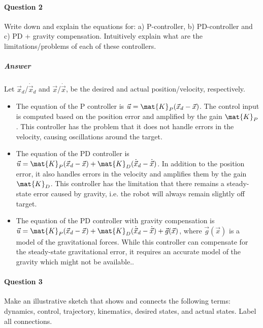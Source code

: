 	\paragraph{Question 2}
		Write down and explain the equations for: a) P-controller, b) PD-controller and c) PD + gravity compensation. Intuitively explain what are the limitations/problems of each of these controllers.

		\subparagraph{Answer}
			Let \(\vec{x}_d\)/\(\dot{\vec{x}}_d\) and \(\vec{x}\)/\(\dot{\vec{x}}\), be the desired and actual position/velocity, respectively.
			\begin{itemize}
				\item The equation of the P controller is \( \vec{u} = \mat{K}_P (\vec{x}_d - \vec{x}) \). The control input is computed based on the position error and amplified by the gain \(\mat{K}_P\). This controller has the problem that it does not handle errors in the velocity, causing oscillations around the target.
				\item The equation of the PD controller is \( \vec{u} = \mat{K}_P (\vec{x}_d - \vec{x}) + \mat{K}_D (\dot{\vec{x}}_d - \dot{\vec{x}}) \). In addition to the position error, it also handles errors in the velocity and amplifies them by the gain \(\mat{K}_D\). This controller has the limitation that there remains a steady-state error caused by gravity, i.e. the robot will always remain slightly off target.
				\item The equation of the PD controller with gravity compensation is \( \vec{u} = \mat{K}_P (\vec{x}_d - \vec{x}) + \mat{K}_D (\dot{\vec{x}}_d - \dot{\vec{x}}) + \vec{g}(\vec{x}) \), where \(\vec{g}(\vec{x})\) is a model of the gravitational forces. While this controller can compensate for the steady-state gravitational error, it requires an accurate model of the gravity which might not be available..
			\end{itemize}

	\paragraph{Question 3}
		Make an illustrative sketch that shows and connects the following terms: dynamics, control, trajectory, kinematics, desired states, and actual states. Label all connections.

